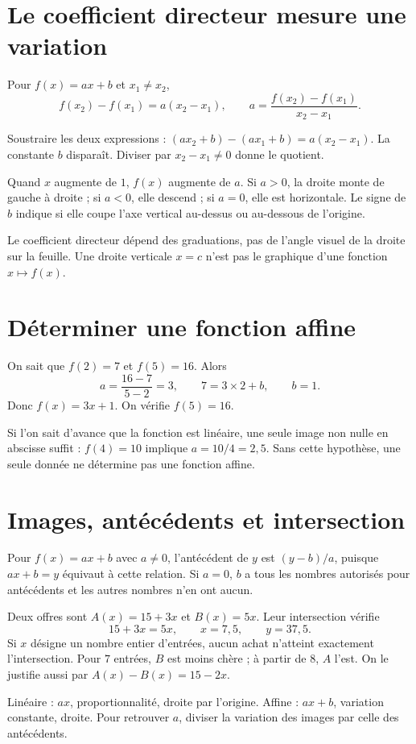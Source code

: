 \documentclass[../cours_3e.tex]{subfiles}
\begin{document}
\section{Le coefficient directeur mesure une variation}
\begin{propriete}
Pour $f(x)=ax+b$ et $x_1\ne x_2$,
\[f(x_2)-f(x_1)=a(x_2-x_1),\qquad
a=\frac{f(x_2)-f(x_1)}{x_2-x_1}.\]
\end{propriete}
\begin{demonstration}
Soustraire les deux expressions : $(ax_2+b)-(ax_1+b)=a(x_2-x_1)$. La constante $b$ disparaît. Diviser par $x_2-x_1\ne0$ donne le quotient.
\end{demonstration}
Quand $x$ augmente de $1$, $f(x)$ augmente de $a$. Si $a>0$, la droite monte de gauche à droite ; si $a<0$, elle descend ; si $a=0$, elle est horizontale. Le signe de $b$ indique si elle coupe l'axe vertical au-dessus ou au-dessous de l'origine.
\begin{attention}
Le coefficient directeur dépend des graduations, pas de l'angle visuel de la droite sur la feuille. Une droite verticale $x=c$ n'est pas le graphique d'une fonction $x\mapsto f(x)$.
\end{attention}
\section{Déterminer une fonction affine}
\begin{exemple}
On sait que $f(2)=7$ et $f(5)=16$. Alors
\[a=\frac{16-7}{5-2}=3,\qquad 7=3\times2+b,\qquad b=1.\]
Donc $f(x)=3x+1$. On vérifie $f(5)=16$.
\end{exemple}
Si l'on sait d'avance que la fonction est linéaire, une seule image non nulle en abscisse suffit : $f(4)=10$ implique $a=10/4=2{,}5$. Sans cette hypothèse, une seule donnée ne détermine pas une fonction affine.
\section{Images, antécédents et intersection}
Pour $f(x)=ax+b$ avec $a\ne0$, l'antécédent de $y$ est $(y-b)/a$, puisque $ax+b=y$ équivaut à cette relation.
Si $a=0$, $b$ a tous les nombres autorisés pour antécédents et les autres nombres n'en ont aucun.
\begin{exemple}
Deux offres sont $A(x)=15+3x$ et $B(x)=5x$. Leur intersection vérifie
\[15+3x=5x,\qquad x=7{,}5,\qquad y=37{,}5.\]
Si $x$ désigne un nombre entier d'entrées, aucun achat n'atteint exactement l'intersection. Pour $7$ entrées, $B$ est moins chère ; à partir de $8$, $A$ l'est. On le justifie aussi par $A(x)-B(x)=15-2x$.
\end{exemple}
\begin{retenir}
Linéaire : $ax$, proportionnalité, droite par l'origine. Affine : $ax+b$, variation constante, droite. Pour retrouver $a$, diviser la variation des images par celle des antécédents.
\end{retenir}
\end{document}
